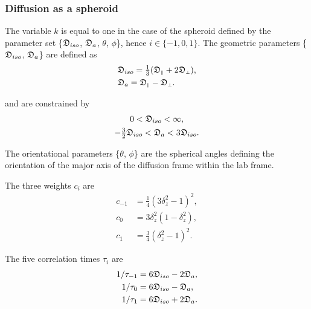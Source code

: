 \begin{htmlonly}
\begin{htmlonly}
\subsubsection{Diffusion as a spheroid}

The variable $k$ is equal to one in the case of the spheroid defined by the parameter set \{$\mathfrak{D}_{iso}$, $\mathfrak{D}_a$, $\theta$, $\phi$\}, hence $i \in \{-1, 0, 1\}$.
The geometric parameters \{$\mathfrak{D}_{iso}$, $\mathfrak{D}_a$\} are defined as
\begin{subequations}
\begin{align}
    & \mathfrak{D}_{iso} = \tfrac{1}{3} (\mathfrak{D}_{\scriptscriptstyle \parallel} + 2\mathfrak{D}_{\scriptscriptstyle \perp}),   \label{eq: Diso spheroid def} \\
    & \mathfrak{D}_a = \mathfrak{D}_{\scriptscriptstyle \parallel} - \mathfrak{D}_{\scriptscriptstyle \perp}.                       \label{eq: Da spheroid def}
\end{align}
\end{subequations}

\noindent and are constrained by
\begin{subequations}
\begin{gather}
    0 < \mathfrak{D}_{iso} < \infty, \\
    -\tfrac{3}{2} \mathfrak{D}_{iso} < \mathfrak{D}_a < 3\mathfrak{D}_{iso}.
\end{gather}
\end{subequations}

\noindent The orientational parameters \{$\theta$, $\phi$\} are the spherical angles defining the orientation of the major axis of the diffusion frame within the lab frame.


The three weights $c_i$ are
\begin{subequations}
\begin{align}
    c_{-1} &= \tfrac{1}{4}(3\delta_z^2 - 1)^2, \label{eq: spheroid c-1} \\
    c_{0}  &= 3\delta_z^2(1 - \delta_z^2),     \label{eq: spheroid c0} \\
    c_{1}  &= \tfrac{3}{4}(\delta_z^2 - 1)^2.  \label{eq: spheroid c1}
\end{align}
\end{subequations}

The five correlation times $\tau_i$ are
\begin{subequations}
\begin{align}
    1/\tau_{-1} &= 6\mathfrak{D}_{iso} - 2\mathfrak{D}_a,    \label{eq: spheroid tau-1} \\
    1/\tau_{0}  &= 6\mathfrak{D}_{iso} - \mathfrak{D}_a,     \label{eq: spheroid tau0} \\
    1/\tau_{1}  &= 6\mathfrak{D}_{iso} + 2\mathfrak{D}_a.    \label{eq: spheroid tau1}
\end{align}
\end{subequations}




\end{htmlonly}
\end{htmlonly}
